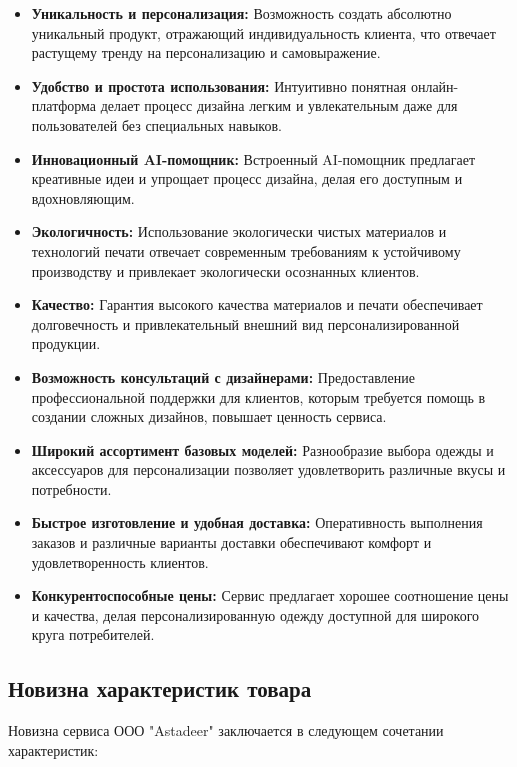 \begin{itemize}
    \item \textbf{Уникальность и персонализация:}  Возможность создать абсолютно уникальный продукт, отражающий индивидуальность клиента, что отвечает растущему тренду на персонализацию и самовыражение.
    \item \textbf{Удобство и простота использования:}  Интуитивно понятная онлайн-платформа делает процесс дизайна легким и увлекательным даже для пользователей без специальных навыков.
    \item \textbf{Инновационный AI-помощник:}  Встроенный AI-помощник предлагает креативные идеи и упрощает процесс дизайна, делая его доступным и вдохновляющим.
    \item \textbf{Экологичность:}  Использование экологически чистых материалов и технологий печати отвечает современным требованиям к устойчивому производству и привлекает экологически осознанных клиентов.
    \item \textbf{Качество:}  Гарантия высокого качества материалов и печати обеспечивает долговечность и привлекательный внешний вид персонализированной продукции.
    \item \textbf{Возможность консультаций с дизайнерами:}  Предоставление профессиональной поддержки для клиентов, которым требуется помощь в создании сложных дизайнов, повышает ценность сервиса.
    \item \textbf{Широкий ассортимент базовых моделей:}  Разнообразие выбора одежды и аксессуаров для персонализации позволяет удовлетворить различные вкусы и потребности.
    \item \textbf{Быстрое изготовление и удобная доставка:}  Оперативность выполнения заказов и различные варианты доставки обеспечивают комфорт и удовлетворенность клиентов.
    \item \textbf{Конкурентоспособные цены:}  Сервис предлагает хорошее соотношение цены и качества, делая персонализированную одежду доступной для широкого круга потребителей.
\end{itemize}

\subsection{Новизна характеристик товара}

Новизна сервиса ООО "Astadeer" заключается в следующем сочетании характеристик:

